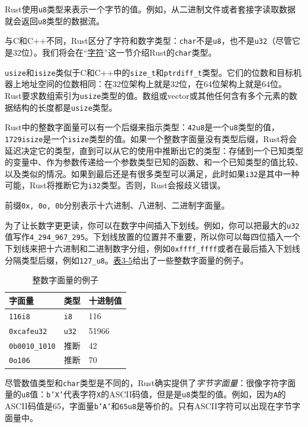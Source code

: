 Rust使用\texttt{u8}类型来表示一个字节的值。例如，从二进制文件或者套接字读取数据就会返回\texttt{u8}类型的数据流。

与C和C++不同，Rust区分了字符和数字类型：\texttt{char}不是\texttt{u8}，也不是\texttt{u32}（尽管它是32位）。我们将会在“\hyperref[char]{字符}”这一节介绍Rust的\texttt{char}类型。

\texttt{usize}和\texttt{isize}类似于C和C++中的\texttt{size\_t}和\texttt{ptrdiff\_t}类型。它们的位数和目标机器上地址空间的位数相同：在32位架构上就是32位，在64位架构上就是64位。Rust要求数组索引为\texttt{usize}类型的值。数组或vector或其他任何含有多个元素的数据结构的长度都是\texttt{usize}类型。

Rust中的整数字面量可以有一个后缀来指示类型：\texttt{42u8}是一个\texttt{u8}类型的值，\texttt{1729isize}是一个\texttt{isize}类型的值。如果一个整数字面量没有类型后缀，Rust将会延迟决定它的类型，直到可以从它的使用中推断出它的类型：存储到一个已知类型的变量中、作为参数传递给一个参数类型已知的函数、和一个已知类型的值比较、以及类似的情况。如果到最后还是有很多类型可以满足，此时如果\texttt{i32}是其中一种可能，Rust将推断它为\texttt{i32}类型。否则，Rust会报歧义错误。

前缀\texttt{0x, 0o, 0b}分别表示十六进制、八进制、二进制字面量。

为了让长数字更更读，你可以在数字中间插入下划线。例如，你可以把最大的\texttt{u32}值写作\texttt{4\_294\_967\_295}。下划线放置的位置并不重要，所以你可以每四位插入一个下划线来把十六进制和二进制数字分组，例如\texttt{0xffff\_ffff}或者在最后插入下划线分隔类型后缀，例如\texttt{127\_u8}。\hyperref[t3-5]{表3-5}给出了一些整数字面量的例子。
\begin{table}[htbp]
    \centering
    \caption{整数字面量的例子}
    \label{t3-5}
    \begin{tabular}{lll}
        \hline
        \textbf{字面量} & \textbf{类型} & \textbf{十进制值} \\
        \hline
        \texttt{116i8}          & \texttt{i8}       &   116 \\
        \rowcolor{tablecolor}
        \texttt{0xcafeu32}      & \texttt{u32}      &   51966 \\
        \texttt{0b0010\_1010}   & 推断              &   42 \\
        \rowcolor{tablecolor}
        \texttt{0o106}          & 推断              &   70 \\
    \end{tabular}
\end{table}

尽管数值类型和\texttt{char}类型是不同的，Rust确实提供了\emph{字节字面量}：很像字符字面量的\texttt{u8}值：\texttt{b'X'}代表字符\texttt{X}的ASCII码值，但是是\texttt{u8}类型的值。例如，因为\texttt{A}的ASCII码值是65，字面量\texttt{b'A'}和\texttt{65u8}是等价的。只有ASCII字符可以出现在字节字面量中。

